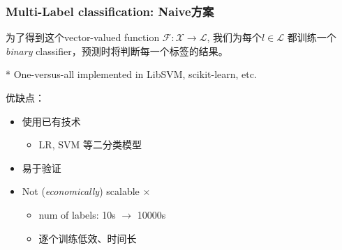 \documentclass{beamer}
\begin{document}
\begin{frame}
\frametitle{Multi-Label classification: Naive方案}

为了得到这个vector-valued function $\mathcal{F} : \mathcal{X} \rightarrow \mathcal{L}$, 我们为每个$\mathit{l} \in \mathcal{L}$ 都训练一个\textit{binary} classifier，预测时将判断每一个标签的结果。

* {\small \color{gray} One-versus-all implemented in LibSVM, scikit-learn, etc.}

\pause

优缺点：
\begin{itemize}
\item 使用已有技术 {  \color{green} \checkmark}
  \begin{itemize}
  \item LR, SVM 等二分类模型
  \end{itemize}
\item 易于验证 {  \color{green} \checkmark}
\item Not (\textit{economically}) scalable  {  \color{red} $\times$}
  \begin{itemize}
  \item num of labels: 10s $\rightarrow$ 10000s 
  \item 逐个训练低效、时间长
  \end{itemize}
\end{itemize}
\end{frame}
\end{document}
